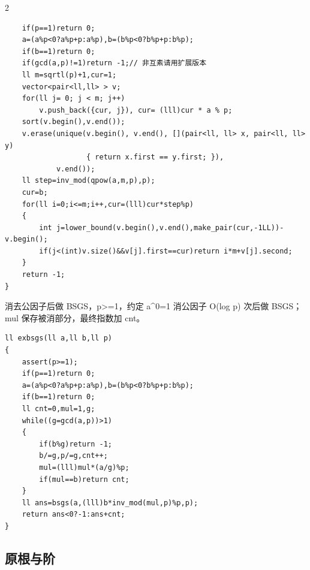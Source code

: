 \documentclass[UTF8,fontset=fandol,a4paper,twoside]{ctexart}
\newcommand{\note}[1]{{\fontsize{10}{12}\selectfont #1\par}}
\begin{document}
\begin{multicols}{2}
\begin{lstlisting}
    if(p==1)return 0;
    a=(a%p<0?a%p+p:a%p),b=(b%p<0?b%p+p:b%p);
    if(b==1)return 0;
    if(gcd(a,p)!=1)return -1;// 非互素请用扩展版本
    ll m=sqrtl(p)+1,cur=1;
    vector<pair<ll,ll> > v;
    for(ll j= 0; j < m; j++)
        v.push_back({cur, j}), cur= (lll)cur * a % p;
    sort(v.begin(),v.end());
    v.erase(unique(v.begin(), v.end(), [](pair<ll, ll> x, pair<ll, ll> y)
                   { return x.first == y.first; }),
            v.end());
    ll step=inv_mod(qpow(a,m,p),p);
    cur=b;
    for(ll i=0;i<=m;i++,cur=(lll)cur*step%p)
    {
        int j=lower_bound(v.begin(),v.end(),make_pair(cur,-1LL))-v.begin();
        if(j<(int)v.size()&&v[j].first==cur)return i*m+v[j].second;
    }
    return -1;
}
\end{lstlisting}
\note{消去公因子后做 BSGS，p>\allowbreak{}=\allowbreak{}1，约定 a\textasciicircum{}0=\allowbreak{}1 消公因子 O(\allowbreak{}log p)\allowbreak{} 次后做 BSGS；mul 保存被消部分，最终指数加 cnt。}
\begin{lstlisting}
ll exbsgs(ll a,ll b,ll p)
{
    assert(p>=1);
    if(p==1)return 0;
    a=(a%p<0?a%p+p:a%p),b=(b%p<0?b%p+p:b%p);
    if(b==1)return 0;
    ll cnt=0,mul=1,g;
    while((g=gcd(a,p))>1)
    {
        if(b%g)return -1;
        b/=g,p/=g,cnt++;
        mul=(lll)mul*(a/g)%p;
        if(mul==b)return cnt;
    }
    ll ans=bsgs(a,(lll)b*inv_mod(mul,p)%p,p);
    return ans<0?-1:ans+cnt;
}
\end{lstlisting}
\subsection{原根与阶}


\end{multicols}
\end{document}
